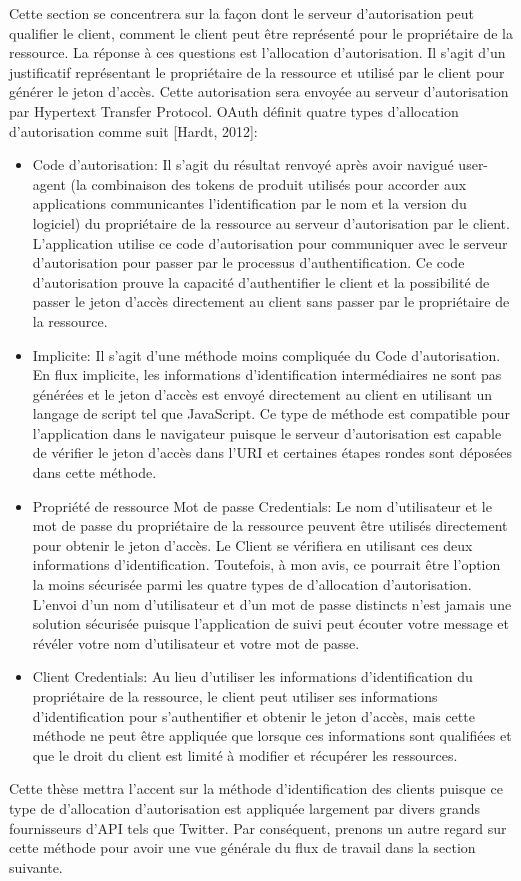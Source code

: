Cette section se concentrera sur la façon dont le serveur d'autorisation peut qualifier le client, comment le client peut être représenté pour le propriétaire de la ressource. La réponse à ces questions est l'allocation d'autorisation. Il s'agit d'un justificatif représentant le propriétaire de la ressource et utilisé par le client pour générer le jeton d'accès. Cette autorisation sera envoyée au serveur d'autorisation par Hypertext Transfer Protocol. OAuth définit quatre types d'allocation d'autorisation comme suit [Hardt, 2012]:
\begin{itemize}
\item Code d'autorisation: Il s'agit du résultat renvoyé après avoir navigué user-agent (la combinaison des tokens de produit utilisés pour accorder aux applications communicantes l'identification par le nom et la version du logiciel) du propriétaire de la ressource au serveur d'autorisation par le client. L'application utilise ce code d'autorisation pour communiquer avec le serveur d'autorisation pour passer par le processus d'authentification. Ce code d'autorisation prouve la capacité d'authentifier le client et la possibilité de passer le jeton d'accès directement au client sans passer par le propriétaire de la ressource.
\item Implicite: Il s'agit d'une méthode moins compliquée du Code d'autorisation. En flux implicite, les informations d'identification intermédiaires ne sont pas générées et le jeton d'accès est envoyé directement au client en utilisant un langage de script tel que JavaScript. Ce type de méthode est compatible pour l'application dans le navigateur puisque le serveur d'autorisation est capable de vérifier le jeton d'accès dans l'URI et certaines étapes rondes sont déposées dans cette méthode.
\item Propriété de ressource Mot de passe Credentials: Le nom d'utilisateur et le mot de passe du propriétaire de la ressource peuvent être utilisés directement pour obtenir le jeton d'accès. Le Client se vérifiera en utilisant ces deux informations d'identification. Toutefois, à mon avis, ce pourrait être l'option la moins sécurisée parmi les quatre types de d'allocation d'autorisation. L'envoi d'un nom d'utilisateur et d'un mot de passe distincts n'est jamais une solution sécurisée puisque l'application de suivi peut écouter votre message et révéler votre nom d'utilisateur et votre mot de passe.
\item Client Credentials: Au lieu d'utiliser les informations d'identification du propriétaire de la ressource, le client peut utiliser ses informations d'identification pour s'authentifier et obtenir le jeton d'accès, mais cette méthode ne peut être appliquée que lorsque ces informations sont qualifiées et que le droit du client est limité à modifier et récupérer les ressources.
\end{itemize}
Cette thèse mettra l'accent sur la méthode d'identification des clients puisque ce type de d'allocation d'autorisation est appliquée largement par divers grands fournisseurs d'API tels que Twitter. Par conséquent, prenons un autre regard sur cette méthode pour avoir une vue générale du flux de travail dans la section suivante.

